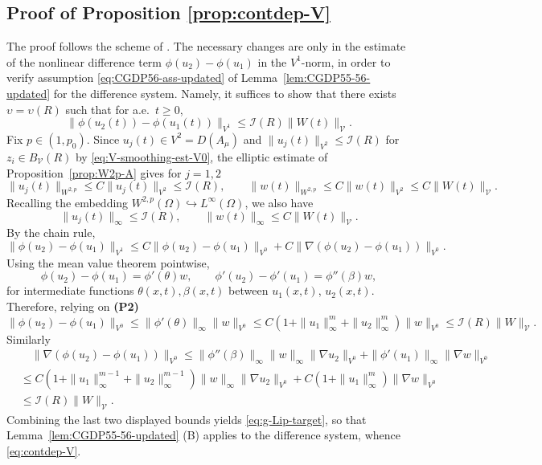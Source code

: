 \documentclass[12pt,leqno]{amsart}
\theoremstyle{definition}
\numberwithin{equation}{section}
\numberwithin{figure}{section}
\begin{document}
 
 



\subsection{Proof of Proposition \ref{prop:contdep-V}}
The proof follows the scheme of \cite[Proposition~6.3]{CGDP2010}. The necessary changes are only in the
estimate of the nonlinear difference term $\phi(u_2)-\phi(u_1)$ in the ${V^1}$-norm, in order to verify
assumption \eqref{eq:CGDP56-ass-updated} of Lemma~\ref{lem:CGDP55-56-updated}  for the
difference system.
Namely, it suffices to show that there exists
$\upsilon=\upsilon(R)$ such that for a.e.\ $t\ge 0$,
\begin{equation}\label{eq:g-Lip-target}
\|\phi(u_2(t))-\phi(u_1(t))\|_{{V^1}}\le \mathcal I(R)\|W(t)\|_{\mathcal V}.
\end{equation} 
Fix $p\in(1,p_0)$.
Since $u_j(t)\in {V^2}=D(A_\mu)$ and $\|u_j(t)\|_{{V^2}}\le \mathcal I(R)$ for $z_i\in B_{\mathcal V}(R)$ by \eqref{eq:V-smoothing-est-V0}, the elliptic estimate of
Proposition~\ref{prop:W2p-A}     gives for $j=1,2$
\[
\|u_j(t)\|_{W^{2,p}}\le C \|u_j(t)\|_{{V^2}}\le \mathcal I(R),
\qquad
\|w(t)\|_{W^{2,p}}\le C \|w(t)\|_{{V^2}}\le C\|W(t)\|_{\mathcal V}.
\]
Recalling the embedding $W^{2,p}(\Omega)\hookrightarrow L^\infty(\Omega)$, we also have  
\begin{equation}\label{eq:Linfty-from-V}
\|u_j(t)\|_{\infty}\le \mathcal I(R),
\qquad
\|w(t)\|_{\infty}\le C\|W(t)\|_{\mathcal V}.
\end{equation}
By the chain rule, 
\[
\|\phi(u_2)-\phi(u_1)\|_{{V^1}}\leq C \|\phi(u_2)-\phi(u_1)\|_{V^0}
+ C\|\nabla(\phi(u_2)-\phi(u_1))\|_{V^0}.
\]
Using the mean value theorem pointwise,
\[
\phi(u_2)-\phi(u_1)=\phi'(\theta)w,\qquad 
\phi'(u_2)-\phi'(u_1)=\phi''(\beta)w,
\]
for intermediate functions $\theta(x,t),\beta(x,t)$ between $u_1(x,t)$, $u_2(x,t)$.
Therefore, relying on \textbf{(P2)}
\[
\|\phi(u_2)-\phi(u_1)\|_{V^0}\le \|\phi'(\theta)\|_{\infty}\|w\|_{V^0} \leq C\left(1+ \|u_1\|_\infty^{m} + \|u_2\|_\infty^{m}\right) \|w\|_{V^0}  \leq \mathcal I (R) \|W\|_{\mathcal V}.
\]
Similarly
\begin{equation}\label{eq:grad-diff-phi}
\begin{split}
 &\quad \|\nabla(\phi(u_2)-\phi(u_1))\|_{V^0}
\le \|\phi''(\beta)\|_{\infty}\|w\|_{\infty}\|\nabla u_2\|_{V^0}
+\|\phi'(u_1)\|_{\infty}\|\nabla w\|_{V^0}
\\ & \leq C\left(1+ \|u_1\|_\infty^{m-1} + \|u_2\|_\infty^{m-1}\right) \|w\|_{\infty}\|\nabla u_2\|_{V^0} +  C\left(1+ \|u_1\|_\infty^{m}  \right)\|\nabla w\|_{V^0}\\ &\leq \mathcal I (R) \|W\|_{\mathcal V}.
\end{split}
\end{equation}
Combining the  last two displayed bounds  yields \eqref{eq:g-Lip-target}, so that 
  Lemma~\ref{lem:CGDP55-56-updated} \textup{(B)} applies    to the difference system, whence \eqref{eq:contdep-V}.
 
\end{document}
